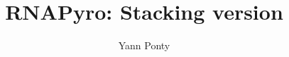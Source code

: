 \documentclass[11pt]{article} %
\title{RNAPyro: Stacking version}
\author{Yann Ponty}
\begin{document}
\maketitle
\newcommand{\Z}[3]{\mathcal{Z}_{\substack{(#1)\\ [#3]}}^{#2}}
\newcommand{\Y}[3]{\mathcal{Y}_{\substack{(#1)\\ [#3]}}^{#2}}
\newcommand{\B}{\mathcal{B}}
\newcommand{\Kron}{\delta}
\newcommand{\ub}{\bullet}


%
\end{document}
